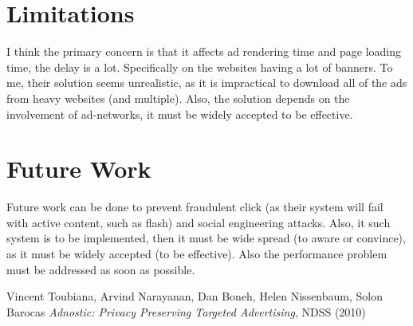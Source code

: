 \documentclass{article}
\begin{document}
\section{Limitations}
I think the primary concern is that it affects ad rendering time and page loading time, the delay is a lot. Specifically on the websites having a lot of banners. To me, their solution seems unrealistic, as it is impractical to download all of the ads from heavy websites (and multiple). Also, the solution depends on the involvement of ad-networks, it must be widely accepted to be effective.

\section{Future Work}
Future work can be done to prevent fraudulent click (as their system will fail with active content, such as flash) and social engineering attacks. Also, it such system is to be implemented, then it must be wide spread (to aware or convince), as it must be widely accepted (to be effective). Also the performance problem must be addressed as soon as possible.

\begin{thebibliography}{99}

 Vincent Toubiana, Arvind Narayanan, Dan Boneh, Helen Nissenbaum, Solon Barocas \emph{Adnostic: Privacy Preserving Targeted Advertising}, {NDSS} (2010)

\end{thebibliography}
\end{document}
